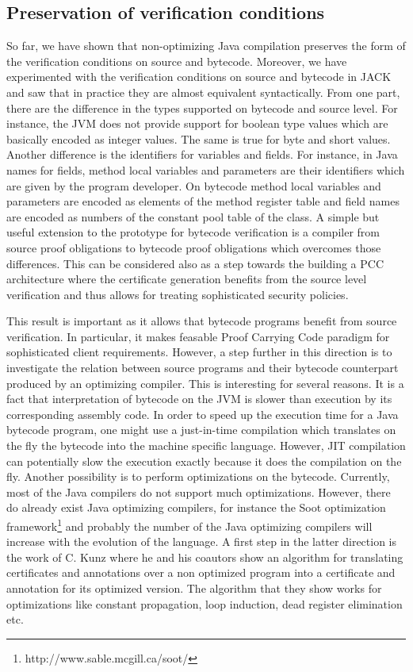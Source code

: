  
\subsection{Preservation of verification conditions}

So far, we have shown that non-optimizing Java compilation
 preserves the  form of the verification conditions on source and
 bytecode. 
Moreover, we have experimented with the verification conditions on source and
 bytecode in JACK and saw that in practice they are almost equivalent
 syntactically. From one part, there are the difference in the types 
 supported on bytecode and source level. For instance, the JVM does not
 provide support for boolean type values which are basically encoded as
 integer values. The same is true for byte and short values.  Another
 difference is the identifiers for variables and fields. For instance, in Java
 names for fields, method local variables and parameters are their identifiers which are given by the
 program developer. On bytecode method local variables and parameters are encoded as elements of the
 method register table and field names are encoded as numbers of the constant
 pool table of the class. A  simple but useful extension to the prototype for
 bytecode verification is a compiler from source proof obligations to bytecode proof obligations
 which overcomes those differences. This can be considered also as a step
 towards the  building a PCC architecture where the certificate generation benefits from
 the source level verification and thus allows for treating sophisticated
 security policies.

This result is important as it allows that bytecode programs  benefit from source verification. In particular, it makes
feasable Proof Carrying Code paradigm for sophisticated client requirements. However, a step further in this direction is to investigate the 
relation between source programs and their bytecode counterpart produced by an optimizing compiler.  This is interesting for several reasons.
It is a fact that interpretation of bytecode on the JVM is slower than execution by its corresponding assembly code. 
In order to speed up the execution time for a Java bytecode program, one might use 
a just-in-time compilation which  translates on the fly the bytecode into the machine specific language. However, JIT compilation can potentially slow
the execution exactly because it does the compilation on the fly.  Another possibility is to perform 
optimizations on the bytecode. Currently, most of the  Java compilers do not support much optimizations.
 However, there do already exist Java optimizing compilers, for instance the Soot optimization framework\footnote{http://www.sable.mcgill.ca/soot/} 
and probably the number of the Java optimizing compilers will increase with the evolution of the language.
A first step in the latter direction is the work of C. Kunz \cite{BGKRsas06} where he and his coautors show an algorithm for translating 
certificates and annotations over a non optimized program into a certificate  and annotation for its optimized version.
The algorithm that they show works for optimizations like constant propagation, loop induction,
dead register elimination etc. 

